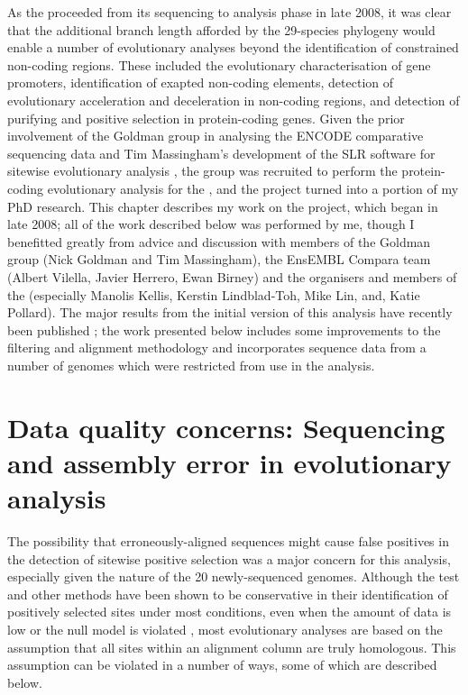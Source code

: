 As the \mgp proceeded from its sequencing to analysis phase in late
2008, it was clear that the additional branch length afforded by the
29-species phylogeny would enable a number of evolutionary analyses
beyond the identification of constrained non-coding regions. These
included the evolutionary characterisation of gene promoters,
identification of exapted non-coding elements, detection of
evolutionary acceleration and deceleration in non-coding regions, and
detection of purifying and positive selection in protein-coding
genes. Given the prior involvement of the Goldman group in analysing
the ENCODE comparative sequencing data
\citep{Margulies2007,ENCODE_Project_Consortium2007a} and Tim
Massingham's development of the SLR software for sitewise evolutionary
analysis \citep{Massingham2005}, the group was recruited to perform
the protein-coding evolutionary analysis for the \mgp, and the project
turned into a portion of my PhD research. This chapter describes my
work on the project, which began in late 2008; all of the work
described below was performed by me, though I benefitted greatly from
advice and discussion with members of the Goldman group (Nick Goldman
and Tim Massingham), the EnsEMBL Compara team (Albert Vilella, Javier
Herrero, Ewan Birney) and the organisers and members of the \mgp
(especially Manolis Kellis, Kerstin Lindblad-Toh, Mike Lin, and, Katie
Pollard). The major results from the initial version of this analysis
have recently been published \citep{LindbladToh2011}; the work
presented below includes some improvements to the filtering and
alignment methodology and incorporates sequence data from a number of
genomes which were restricted from use in the \mgp analysis.

\section{Data quality concerns: Sequencing and assembly error in evolutionary analysis}

The possibility that erroneously-aligned sequences might cause false
positives in the detection of sitewise positive selection was a major
concern for this analysis, especially given the \lcv nature of the 20
newly-sequenced genomes. Although the \slr test and other \sw \ml
methods have been shown to be conservative in their identification of
positively selected sites under most conditions, even when the amount
of data is low or the null model is violated
\citep{Anisimova2002,Anisimova2003,Massingham2005}, most evolutionary
analyses are based on the assumption that all sites within an
alignment column are truly homologous. This assumption can be violated
in a number of ways, some of which are described below.

